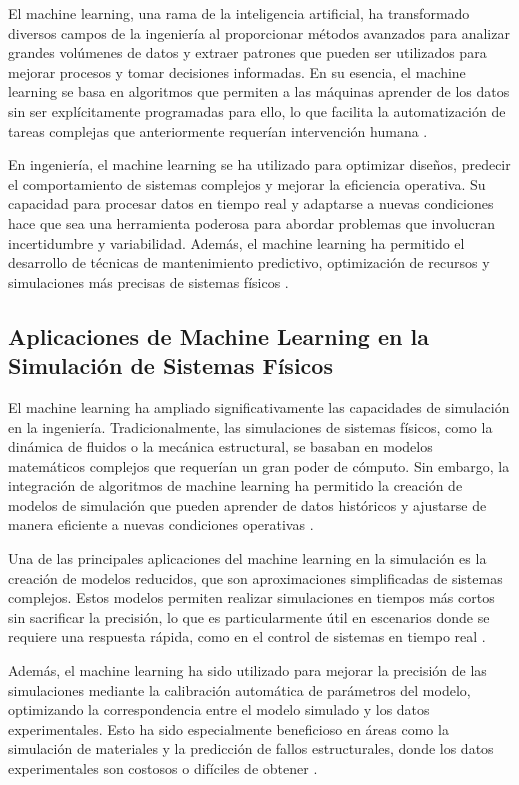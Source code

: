 El machine learning, una rama de la inteligencia artificial, ha transformado diversos campos de la ingeniería al proporcionar métodos avanzados para analizar grandes volúmenes de datos y extraer patrones que pueden ser utilizados para mejorar procesos y tomar decisiones informadas. En su esencia, el machine learning se basa en algoritmos que permiten a las máquinas aprender de los datos sin ser explícitamente programadas para ello, lo que facilita la automatización de tareas complejas que anteriormente requerían intervención humana \cite{bishop2006pattern}.

En ingeniería, el machine learning se ha utilizado para optimizar diseños, predecir el comportamiento de sistemas complejos y mejorar la eficiencia operativa. Su capacidad para procesar datos en tiempo real y adaptarse a nuevas condiciones hace que sea una herramienta poderosa para abordar problemas que involucran incertidumbre y variabilidad. Además, el machine learning ha permitido el desarrollo de técnicas de mantenimiento predictivo, optimización de recursos y simulaciones más precisas de sistemas físicos \cite{goodfellow2016deep}.

\subsection{Aplicaciones de Machine Learning en la Simulación de Sistemas Físicos}

El machine learning ha ampliado significativamente las capacidades de simulación en la ingeniería. Tradicionalmente, las simulaciones de sistemas físicos, como la dinámica de fluidos o la mecánica estructural, se basaban en modelos matemáticos complejos que requerían un gran poder de cómputo. Sin embargo, la integración de algoritmos de machine learning ha permitido la creación de modelos de simulación que pueden aprender de datos históricos y ajustarse de manera eficiente a nuevas condiciones operativas \cite{brunton2016discovering}.

Una de las principales aplicaciones del machine learning en la simulación es la creación de modelos reducidos, que son aproximaciones simplificadas de sistemas complejos. Estos modelos permiten realizar simulaciones en tiempos más cortos sin sacrificar la precisión, lo que es particularmente útil en escenarios donde se requiere una respuesta rápida, como en el control de sistemas en tiempo real \cite{kutz2017deep}.

Además, el machine learning ha sido utilizado para mejorar la precisión de las simulaciones mediante la calibración automática de parámetros del modelo, optimizando la correspondencia entre el modelo simulado y los datos experimentales. Esto ha sido especialmente beneficioso en áreas como la simulación de materiales y la predicción de fallos estructurales, donde los datos experimentales son costosos o difíciles de obtener \cite{raissi2019physics}.

